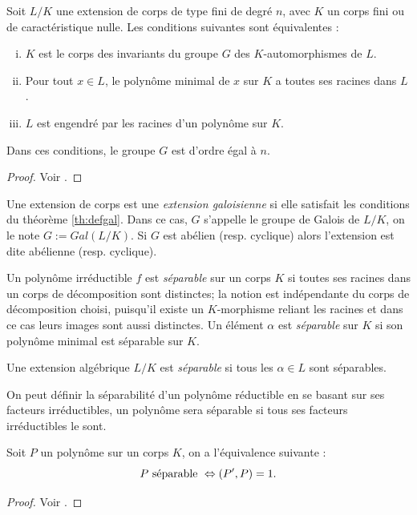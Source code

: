 \documentclass[a4paper]{article} %
\numberwithin{section}{part}
\numberwithin{equation}{section}
\begin{document}
\begin{thm}
\label{th:defgal}
Soit $L/K$ une extension de corps de type fini de degré $n$, avec $K$ un corps
fini ou de caractéristique nulle. Les conditions suivantes sont équivalentes :
\begin{enumerate}[(i)]
	\item $K$ est le corps des invariants du groupe $G$ des $K$-automorphismes
de $L$.
	\item Pour tout $x\in L$, le polynôme minimal de $x$ sur $K$ a toutes ses
racines dans $L$.
	\item $L$ est engendré par les racines d'un polynôme sur $K$.
\end{enumerate}
Dans ces conditions, le groupe $G$ est d'ordre égal à $n$.
\end{thm}
\begin{proof}
Voir \cite[p. 101, th. 1]{Sam}.
\end{proof}

\begin{defn}
\label{def:gal}
Une extension de corps est une \emph{extension galoisienne} si elle satisfait 
les conditions du théorème \ref{th:defgal}. Dans ce cas, $G$ s'appelle le groupe
de Galois de $L/K$, on le note $G := Gal(L/K)$. Si $G$ est abélien (resp. 
cyclique) alors l'extension est dite abélienne (resp. cyclique).
\end{defn}

Un polynôme irréductible $f$ est \emph{séparable} sur un corps $K$ si toutes
ses racines dans un corps de décomposition sont distinctes; la notion est
indépendante du corps de décomposition choisi, puisqu'il existe un $K$-morphisme
reliant les racines et dans ce cas leurs images sont aussi distinctes. 
Un élément $\alpha$ est \emph{séparable} sur $K$ si son polynôme minimal est 
séparable sur $K$.

\begin{defn}
\label{def:sep}
Une extension algébrique $L/K$ est \emph{séparable} si tous les $\alpha\in L$
sont séparables.
\end{defn}

\begin{rem}
On peut définir la séparabilité d'un polynôme réductible en se basant sur ses
facteurs irréductibles, un polynôme sera séparable si tous ses facteurs
irréductibles le sont.
\end{rem}

\begin{prop}
\label{prop:sepderiv}
Soit $P$ un polynôme sur un corps $K$, on a l'équivalence suivante 
:
\begin{equation}
    P\textup{ séparable } \Leftrightarrow (P', P) = 1.
\end{equation}
\end{prop}
\begin{proof}
    Voir \cite[p. 178]{Lan1}.
\end{proof}
\end{document}
